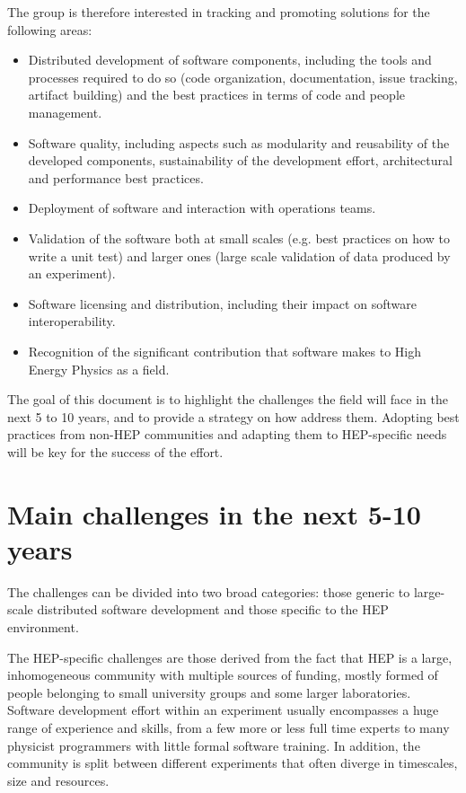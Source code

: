 \documentclass[12pt,a4paper]{article}
\begin{document}
The group is therefore interested in tracking and promoting solutions
for the following areas:

\begin{itemize}
\item
    Distributed development of software components, including the tools
  and processes required to do so (code organization, documentation,
  issue tracking, artifact building) and the best practices in terms of
  code and people management.
  \item
    Software quality, including aspects such as modularity and reusability
  of the developed components, sustainability of the development effort,
  architectural and performance best practices.
  \item
    Deployment of software and interaction with operations teams.
  \item
    Validation of the software both at small scales (e.g. best practices
  on how to write a unit test) and larger ones (large scale validation
  of data produced by an experiment).
  \item
    Software licensing and distribution, including their impact on
  software interoperability.
  \item
    Recognition of the significant contribution that software makes to
  High Energy Physics as a field.
\end{itemize}

The goal of this document is to highlight the challenges the field will
face in the next 5 to 10 years, and to provide a strategy on how address
them. Adopting best practices from non-HEP communities and adapting them
to HEP-specific needs will be key for the success of the effort.

\hypertarget{main-challenges-in-the-next-5-10-years}{%
\section{Main challenges in the next 5-10
years}\label{main-challenges-in-the-next-5-10-years}}

The challenges can be divided into two broad categories: those generic
to large-scale distributed software development and those specific to
the HEP environment.

The HEP-specific challenges are those derived from the fact that HEP is
a large, inhomogeneous community with multiple sources of funding,
mostly formed of people belonging to small university groups and some
larger laboratories. Software development effort within an experiment
usually encompasses a huge range of experience and skills, from a few
more or less full time experts to many physicist programmers with little
formal software training. In addition, the community is split between
different experiments that often diverge in timescales, size and
resources.
\end{document}
